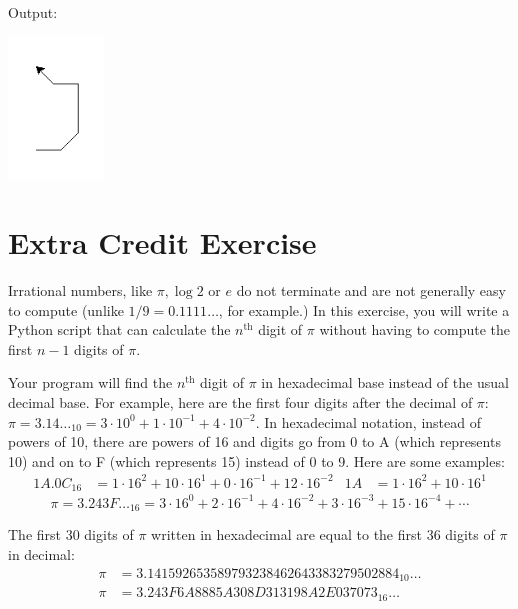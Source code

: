 \documentclass[11pt]{cselabheader}
\begin{document}
{\begin{ex}[navigate.py]
    Output:
    \begin{center}
    \includegraphics[width=1.0in]{img/navigate}
  \end{center}

\end{ex}

\newpage
\section{Extra Credit Exercise}
\vspace{-1.5em}
Irrational numbers, like $\pi, \log 2$ or $e$ do not terminate and are not generally easy to compute (unlike $1/9 = 0.1111\dots$, for example.)
In this exercise, you will write a Python script that can calculate the $n^\text{th}$ digit of $\pi$ without having to compute the first $n-1$ digits of $\pi$.

Your program will find the $n^\text{th}$ digit of $\pi$ in hexadecimal base instead of the usual decimal base. For example, here are the first four digits after the decimal of $\pi$: $\pi = 3.14\dots_{10} = 3 \cdot 10^0 + 1 \cdot 10^{-1} + 4 \cdot 10^{-2}$.
In hexadecimal notation, instead of powers of 10, there are powers of 16 and digits go from 0 to A (which represents 10) and on to F (which represents 15) instead of 0 to 9. Here are some examples:
\begin{align*}
1A.0C_{16} &= 1 \cdot {16^2} + 10 \cdot 16^1 + 0 \cdot 16^{-1} + 12 \cdot 16^{-2}
&
1A &= 1 \cdot {16^2} + 10 \cdot 16^1
\end{align*}
\vspace{-1.5em}
$$\pi = 3.243F\dots_{16} = 3 \cdot 16^0 + 2 \cdot 16^{-1} + 4 \cdot 16^{-2} + 3 \cdot 16^{-3}
      + 15 \cdot 16^{-4} + \cdots
$$

The first 30 digits of $\pi$ written in hexadecimal are equal to the first 36 digits of $\pi$ in decimal:
\begin{align*}
\pi &= 3.141592653589793238462643383279502884_{10}\dots
\\
\pi &= 3.243F6A8885A308D313198A2E037073_{16}\dots
\end{align*}

}
\end{document}
